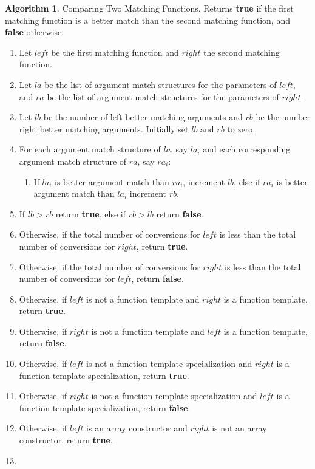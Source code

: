 \documentclass[a4paper,oneside,11pt]{book}
\theoremstyle{definition}
\newtheorem{algo}{Algorithm}[section]
\begin{document}
\begin{algo} Comparing Two Matching Functions.
Returns \textbf{true} if the first matching function is a better match than the second matching function, and \textbf{false} otherwise.
\begin{enumerate}
\item
Let $left$ be the first matching function and $right$ the second matching function.
\item
Let $la$ be the list of argument match structures for the parameters of $left$, and $ra$ be the list of argument match structures for the parameters of $right$.
\item
Let $lb$ be the number of left better matching arguments and $rb$ be the number right better matching arguments. Initially set $lb$ and $rb$ to zero.
\item
For each argument match structure of $la$, say $la_i$ and each corresponding argument match structure of $ra$, say $ra_i$:
\begin{enumerate}
\item
If $la_i$ is better argument match than $ra_i$, increment $lb$, else if $ra_i$ is better argument match than $la_i$ increment $rb$.
\end{enumerate}
\item
If $lb > rb$ return \textbf{true}, else if $rb > lb$ return \textbf{false}.
\item
Otherwise, if the total number of conversions for $left$ is less than the total number of conversions for $right$, return \textbf{true}.
\item
Otherwise, if the total number of conversions for $right$ is less than the total number of conversions for $left$, return \textbf{false}.
\item
Otherwise, if $left$ is not a function template and $right$ is a function template, return \textbf{true}.
\item
Otherwise, if $right$ is not a function template and $left$ is a function template, return \textbf{false}.
\item
Otherwise, if $left$ is not a function template specialization and $right$ is a function template specialization, return \textbf{true}.
\item
Otherwise, if $right$ is not a function template specialization and $left$ is a function template specialization, return \textbf{false}.
\item
Otherwise, if $left$ is an array constructor and $right$ is not an array constructor, return \textbf{true}.
\item

\end{enumerate}
\end{algo}
\end{document}
